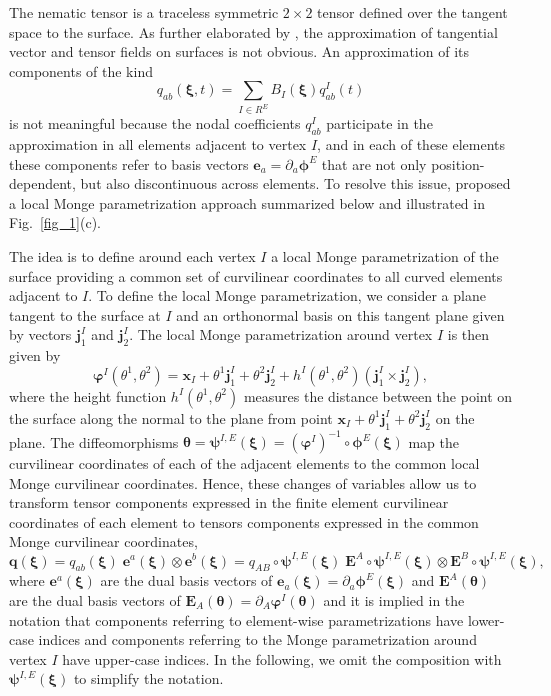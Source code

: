 The nematic tensor is a traceless symmetric $2\times 2$ tensor defined over the tangent space to the surface. As further elaborated by \citet{torres2020}, the approximation of tangential vector and tensor fields on surfaces is not obvious. An approximation of its components of the kind 
\begin{equation} \label{naive_B_q}
  q_{ab}(\bm{\xi},t)= \underset{I \in R^E}{\mathrm{\sum}} B_I(\bm{\xi}) q_{ab}^I(t)
\end{equation} 
is not meaningful because the nodal coefficients $q_{ab}^I$ participate in the approximation in all elements adjacent to vertex $I$, and in each of these elements these components refer to basis vectors $\bm{e}_a = \partial_a \bm{\phi}^E$ that are not only position-dependent, but also discontinuous across elements. To resolve this issue, \citet{torres2020} proposed a local Monge parametrization approach summarized below and illustrated in Fig.~\ref{fig_1}(c). 

The idea is to define around each vertex $I$  a local Monge parametrization of the surface providing a common set of curvilinear coordinates to all curved elements adjacent to $I$. To define the local Monge parametrization, we consider a plane tangent to the surface at $I$ and an orthonormal basis on this tangent plane given by vectors $\bm{j}_1^I$ and $\bm{j}_2^I$. The local Monge parametrization around vertex $I$ is then given by
\begin{equation}\label{9_27}
     \bm{\varphi}^I (\theta^1,\theta^2) =  \bm{x}_I + \theta^1 \bm{j}_1^I +  \theta^2\bm{j}_2^I + h^I(\theta^1,\theta^2) (\bm{j}_1^I \times \bm{j}_2^I),
\end{equation}
where the height function $h^I(\theta^1,\theta^2)$ measures the distance between the point on the surface along the normal to the plane from point $\bm{x}_I + \theta^1 \bm{j}_1^I +  \theta^2\bm{j}_2^I$ on the plane. The diffeomorphisms  $\bm{\theta} = \bm{\psi}^{I,E}(\bm{\xi}) =  (\bm{\varphi}^I)^{-1} \circ \bm{\phi}^E (\bm{\xi})$ map the curvilinear coordinates of each of the adjacent elements to the common local Monge  curvilinear coordinates. Hence, these changes of variables allow us to transform tensor components expressed in the finite element curvilinear coordinates of each element to tensors components expressed in the common Monge curvilinear coordinates, 
\begin{equation} \label{9_28}
\bm{q}(\bm{\xi}) = q_{ab}(\bm{\xi})\; \bm{e}^a(\bm{\xi}) \otimes \bm{e}^b(\bm{\xi}) = q_{AB}\circ\bm{\psi}^{I,E}(\bm{\xi}) \; \bm{E}^A\circ\bm{\psi}^{I,E}(\bm{\xi}) \otimes \bm{E}^B\circ\bm{\psi}^{I,E}(\bm{\xi}), 
\end{equation}
where $\bm{e}^a(\bm{\xi})$ are the dual basis vectors of $\bm{e}_a(\bm{\xi}) = \partial_a \bm{\phi}^E(\bm{\xi})$ and $\bm{E}^A(\bm{\theta}) $ are the dual basis vectors of $\bm{E}_A(\bm{\theta}) = \partial_A\bm{\varphi}^I(\bm{\theta})$ and it is implied in the notation that components referring to element-wise parametrizations have lower-case indices and components referring to the Monge parametrization around vertex $I$ have upper-case indices. In the following, we omit the composition with $\bm{\psi}^{I,E}(\bm{\xi})$ to simplify the notation.

